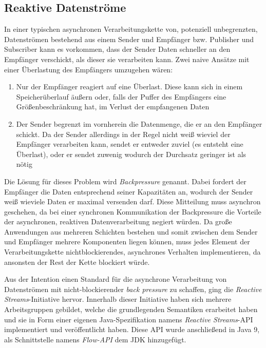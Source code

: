 \subsection{Reaktive Datenströme}
\label{section.reaktive_datenströme}
In einer typischen asynchronen Verarbeitungskette von, potenziell unbegrenzten, Datenströmen
bestehend aus einem Sender und Empfänger bzw. Publisher und Subscriber kann es vorkommen,
dass der Sender Daten schneller an den Empfänger verschickt, als dieser sie verarbeiten kann.
Zwei naive Ansätze mit einer Überlastung des Empfängers umzugehen wären:
\begin{enumerate}
    \item Nur der Empfänger reagiert auf eine Überlast. Diese kann sich in einem Speicherüberlauf äußern oder, falls der Puffer des Empfängers eine Größenbeschränkung
          hat, im Verlust der empfangenen Daten
    \item Der Sender begrenzt im vornherein die Datenmenge, die er an den Empfänger schickt. Da der Sender allerdings in der Regel nicht weiß wieviel der Empfänger
          verarbeiten kann, sendet er entweder zuviel (es entsteht eine Überlast), oder er sendet zuwenig wodurch der Durchsatz geringer ist als nötig
\end{enumerate}\parencite{JavaSpektrum2015}
Die Lösung für dieses Problem wird \textit{Backpressure} genannt.
Dabei fordert der Empfänger die Daten entsprechend seiner Kapazitäten an, wodurch der Sender weiß wieviele Daten er maximal versenden darf.
Diese Mitteilung muss asynchron geschehen, da bei einer synchronen Kommunikation der Backpressure die Vorteile der asynchronen, reaktiven Datenverarbeitung
negiert würden.
Da große Anwendungen aus mehreren Schichten bestehen und somit zwischen dem Sender und Empfänger mehrere Komponenten liegen können, muss jedes
Element der Verarbeitungskette nichtblockierendes, asynchrones Verhalten implementieren, da ansonsten der Rest der Kette blockiert würde.


Aus der Intention einen Standard für die asynchrone Verarbeitung von Datenströmen mit nicht-blockierender \textit{back pressure}
zu schaffen, ging die \textit{Reactive Streams}-Initiative hervor.
Innerhalb dieser Initiative haben sich mehrere Arbeitsgruppen gebildet, welche die grundlegenden Semantiken erarbeitet haben und
sie in Form einer eigenen Java-Spezifikation namens \textit{Reactive Streams}-API implementiert und veröffentlicht haben.\parencite{ReactiveStreams}
Diese API wurde anschließend in Java 9, als Schnittstelle namens \textit{Flow-API} dem JDK hinzugefügt.

